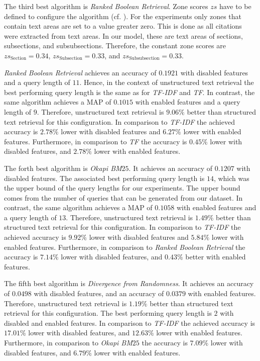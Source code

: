 The third best algorithm is \textit{Ranked Boolean Retrieval}. Zone scores $zs$ have to be defined to configure the algorithm (cf. ). For the experiments only zones that contain text areas are set to a value greater zero. This is done as all citations were extracted from text areas. In our model, these are text areas of sections, subsections, and subsubsections. Therefore, the constant zone scores are $zs_{\text{Section}} = 0.34$, $zs_{\text{Subsection}} = 0.33$, and $zs_{\text{Subsubsection}} = 0.33$.

\textit{Ranked Boolean Retrieval} achieves an accuracy of $0.1921$ with disabled features and a query length of $11$. Hence, in the context of unstructured text retrieval the best performing query length is the same as for \textit{TF-IDF} and \textit{TF}. In contrast, the same algorithm achieves a MAP of $0.1015$ with enabled features and a query length of $9$. Therefore, unstructured text retrieval is $9.06 \%$ better than structured text retrieval for this configuration. In comparison to \textit{TF-IDF} the achieved accuracy is $2.78 \%$ lower with disabled features and $6.27 \%$ lower with enabled features. Furthermore, in comparison to \textit{TF} the accuracy is $0.45 \%$ lower with disabled features, and $2.78 \%$ lower with enabled features.

The forth best algorithm is \textit{Okapi BM$25$}. It achieves an accuracy of $0.1207$ with disabled features. The associated best performing query length is $14$, which was the upper bound of the query lengths for our experiments. The upper bound comes from the number of queries that can be generated from our dataset. In contrast, the same algorithm achieves a MAP of $0.1058$ with enabled features and a query length of $13$. Therefore, unstructured text retrieval is $1.49 \%$ better than structured text retrieval for this configuration. In comparison to \textit{TF-IDF} the achieved accuracy is $9.92 \%$ lower with disabled features and $5.84 \%$ lower with enabled features. Furthermore, in comparison to \textit{Ranked Boolean Retrieval} the accuracy is $7.14 \%$ lower with disabled features, and $0.43 \%$ better with enabled features.

The fifth best algorithm is \textit{Divergence from Randomness}. It achieves an accuracy of $0.0498$ with disabled features, and an accuracy of $0.0379$ with enabled features. Therefore, unstructured text retrieval is $1.19 \%$ better than structured text retrieval for this configuration. The best performing query length is $2$ with disabled and enabled features. In comparison to \textit{TF-IDF} the achieved accuracy is $17.01 \%$ lower with disabled features, and $12.63 \%$ lower with enabled features. Furthermore, in comparison to \textit{Okapi BM$25$} the accuracy is $7.09 \%$ lower with disabled features, and $6.79 \%$ lower with enabled features.

